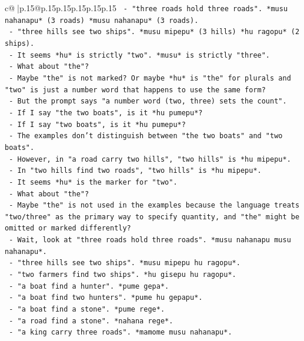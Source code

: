 \documentclass{article}
\begin{document}
{\begin{supertabular}{c@{$\;$}|p{.15\linewidth}@{}p{.15\linewidth}p{.15\linewidth}p{.15\linewidth}p{.15\linewidth}p{.15\linewidth}}
{{{\texttt{    {-} "three roads hold three roads". *musu nahanapu* (3 roads) *musu nahanapu* (3 roads).} \\
\texttt{    {-} "three hills see two ships". *musu mipepu* (3 hills) *hu ragopu* (2 ships).} \\
\texttt{    {-} It seems *hu* is strictly "two". *musu* is strictly "three".} \\
\texttt{    {-} What about "the"?} \\
\texttt{    {-} Maybe "the" is not marked? Or maybe *hu* is "the" for plurals and "two" is just a number word that happens to use the same form?} \\
\texttt{    {-} But the prompt says "a number word (two, three) sets the count".} \\
\texttt{    {-} If I say "the two boats", is it *hu pumepu*?} \\
\texttt{    {-} If I say "two boats", is it *hu pumepu*?} \\
\texttt{    {-} The examples don't distinguish between "the two boats" and "two boats".} \\
\texttt{    {-} However, in "a road carry two hills", "two hills" is *hu mipepu*.} \\
\texttt{    {-} In "two hills find two roads", "two hills" is *hu mipepu*.} \\
\texttt{    {-} It seems *hu* is the marker for "two".} \\
\texttt{    {-} What about "the"?} \\
\texttt{    {-} Maybe "the" is not used in the examples because the language treats "two/three" as the primary way to specify quantity, and "the" might be omitted or marked differently?} \\
\texttt{    {-} Wait, look at "three roads hold three roads". *musu nahanapu musu nahanapu*.} \\
\texttt{    {-} "three hills see two ships". *musu mipepu hu ragopu*.} \\
\texttt{    {-} "two farmers find two ships". *hu gisepu hu ragopu*.} \\
\texttt{    {-} "a boat find a hunter". *pume gepa*.} \\
\texttt{    {-} "a boat find two hunters". *pume hu gepapu*.} \\
\texttt{    {-} "a boat find a stone". *pume rege*.} \\
\texttt{    {-} "a road find a stone". *nahana rege*.} \\
\texttt{    {-} "a king carry three roads". *mamome musu nahanapu*.} \\
}}}
\end{supertabular}}
\end{document}
